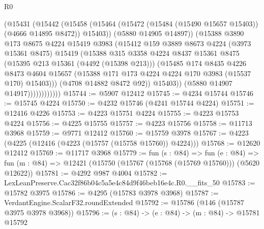 \begin{lexlean}{R0}
\begin{coremodule}
                          (@15431
                            (@15442
                              (@15458
                                (@15464
                                  (@15472 (@15484 (@15490 @15657 @15403)) (@4666 @14895 @8472))
                                  @15403))
                              (@5880 @14905 @14897))
                            (@15388
                              @3890
                              @173
                              @8675
                              @4224
                              @15419
                              @3983
                              (@15412
                                @159
                                @3889
                                @8673
                                @4224
                                (@3973 @15361 @8475)
                                @15419
                                (@15388
                                  @315
                                  @3358
                                  @4224
                                  @8437
                                  @15361
                                  @8475
                                  (@15395 @213 @15361 (@4492 (@15398 @213)))
                                  (@15485
                                    @174
                                    @8435
                                    @4226
                                    @8473
                                    @4604
                                    @15657
                                    (@15388 @171 @173 @4224 @4224 @170 @3983 (@15537 @170) @15403)))
                                (@4708 @14882 @8472 @92))
                              @15403))
                          (@5880 @14907 @14917))))))))))))
@15744 := @5907 @12412
@15745 := @4234 @15744
@15746 := @15745 @4224
@15750 := @4232 @15746 (@4241 @15744 @4224)
@15751 := @12416 @4226
@15753 := @4223 @15751 @4224
@15755 := @4223 @15753 @4224
@15756 := @4225 @15755
@15757 := @4223 @15756
@15758 := @11713 @3968
@15759 := @9771 @12412
@15760 := @15759 @3978
@15767 := @4223 (@4225 (@12416 (@4223 (@15757 (@15758 @15760)) @4224)))
@15768 := @12620 @12412
@15769 := @11717 @3968
@15779 := fun (s : @84) =>
  fun (e : @84) => fun (m : @84) => @12421 (@15750 (@15767 (@15768 (@15769 @15760))) (@5620 @12622))
@15781 := @4292 @987 @4004
@15782 := LexLeanPreserve.Cac32f86b04c5a5e4c84d9f46beb16e4c.R0.__fits_50
@15783 := @15782 @3975
@15786 := @4295 (@15783 @3978 @3968)
@15787 := VerdantEngine.ScalarF32.roundExtended
@15792 := @15786 (@146 (@15787 @3975 @3978 @3968))
@15796 := (s : @84) -> (e : @84) -> (m : @84) -> @15781 @15792

\end{coremodule}
\end{lexlean}
